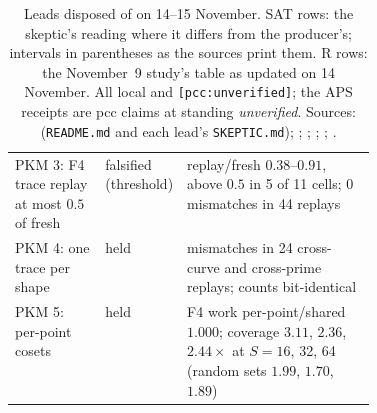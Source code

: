 \begin{table}[tbp]
\begin{tabularx}{\linewidth}{@{}>{\raggedright}p{0.25\linewidth}>{\raggedright}p{0.17\linewidth}>{\raggedright\arraybackslash}X@{}}
PKM 3: F4 trace replay at most $0.5$ of fresh & falsified (threshold) & replay/fresh $0.38$--$0.91$, above $0.5$ in 5 of 11 cells; 0 mismatches in 44 replays \\
PKM 4: one trace per shape & held & 0 mismatches in 24 cross-curve and cross-prime replays; counts bit-identical \\
PKM 5: per-point cosets & held & F4 work per-point/shared $1.000$; coverage $3.11$, $2.36$, $2.44\times$ at $S=16$, 32, 64 (random sets $1.99$, $1.70$, $1.89$) \\
\bottomrule
\end{tabularx}
\caption[]{Leads disposed of on 14--15 November. SAT rows: the skeptic's
reading where it differs from the producer's; intervals in parentheses as
the sources print them. R rows: the November~9 study's table as updated
on 14 November. All local and \texttt{[pcc:unverified]}; the APS
receipts are pcc claims at standing \emph{unverified}. Sources:
 (\texttt{README.md} and each lead's
\texttt{SKEPTIC.md}); ;
;
;
;
.}
\label{tab:open-leads1115}
\end{table}
